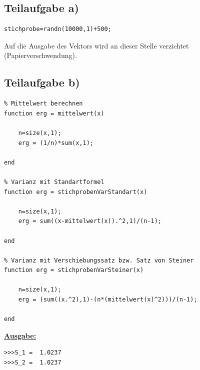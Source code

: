 \documentclass{llncs}
\begin{document}
\subsection*{Teilaufgabe a)}
\begin{lstlisting}
stichprobe=randn(10000,1)+500; 
\end{lstlisting}
Auf die Ausgabe des Vektors wird an dieser Stelle verzichtet (Papierverschwendung).
\subsection*{Teilaufgabe b)}
\begin{lstlisting}
% Mittelwert berechnen
function erg = mittelwert(x)
	
    n=size(x,1);
	erg = (1/n)*sum(x,1);

end

% Varianz mit Standartformel
function erg = stichprobenVarStandart(x)

    n=size(x,1);
	erg = sum((x-mittelwert(x)).^2,1)/(n-1);

end

% Varianz mit Verschiebungssatz bzw. Satz von Steiner
function erg = stichprobenVarSteiner(x)

	n=size(x,1);
	erg = (sum((x.^2),1)-(n*(mittelwert(x)^2)))/(n-1);
    
end
\end{lstlisting}
\underline{\textbf{Ausgabe:}}\\
\begin{lstlisting}
>>>S_1 =  1.0237
>>>S_2 =  1.0237
\end{lstlisting}
\end{document}
